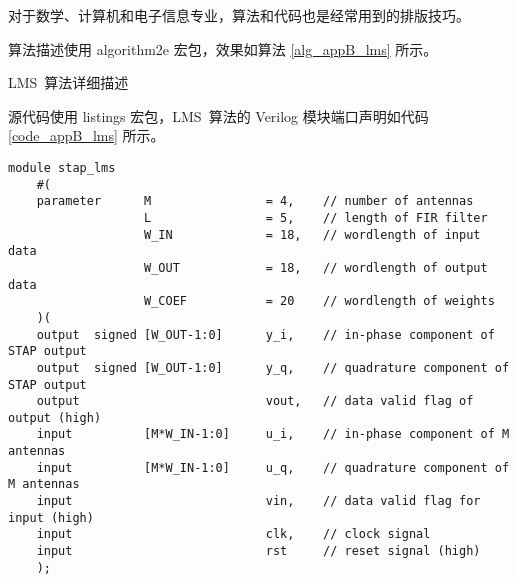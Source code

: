 

对于数学、计算机和电子信息专业，算法和代码也是经常用到的排版技巧。


算法描述使用 algorithm2e 宏包，效果如算法 \ref{alg_appB_lms} 所示。

\begin{algorithm}[ht]
	\caption{LMS~算法详细描述 \label{alg_appB_lms}}
	\IncMargin{2em}
	\DontPrintSemicolon
\end{algorithm}



源代码使用 listings 宏包，LMS~算法的 Verilog 模块端口声明如代码 \ref{code_appB_lms} 所示。

{\fontsize{10pt}{0.5\baselineskip}\selectfont
	\begin{lstlisting}[caption={空时~LMS~算法~Verilog~模块端口声明},label={code_appB_lms}]
	module stap_lms
	#(
	parameter      M                = 4,    // number of antennas
	               L                = 5,    // length of FIR filter
	               W_IN             = 18,   // wordlength of input data
	               W_OUT            = 18,   // wordlength of output data
	               W_COEF           = 20    // wordlength of weights
	)(
	output  signed [W_OUT-1:0]      y_i,    // in-phase component of STAP output
	output  signed [W_OUT-1:0]      y_q,    // quadrature component of STAP output
	output                          vout,   // data valid flag of output (high)
	input          [M*W_IN-1:0]     u_i,    // in-phase component of M antennas
	input          [M*W_IN-1:0]     u_q,    // quadrature component of M antennas
	input                           vin,    // data valid flag for input (high)
	input                           clk,    // clock signal
	input                           rst     // reset signal (high)
	);
	\end{lstlisting}
}

\clearpage{\pagestyle{empty}\cleardoublepage}
